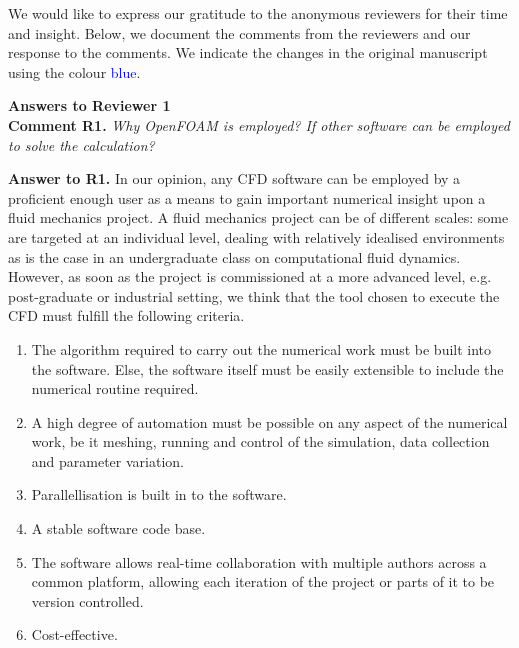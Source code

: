 \documentclass[12pt]{article}
\newcounter{question}
\newcommand{\name}{00}
\newcommand{\question}[1]{\refstepcounter{question} \noindent \textbf{Comment \name.\thequestion}\vskip 0.25cm \noindent \emph{#1}\\}
\newcommand{\answer}[1]{\noindent \textbf{Answer to \name.\thequestion}\vskip 0.25cm \noindent #1 \mbox{}\\}
\newcommand{\newperson}[2]{\renewcommand{\name}{#2} \setcounter{question}{0} \noindent \textbf{\large Answers to #1} \\}
\begin{document}
\noindent We would like to express our gratitude to the anonymous reviewers for their time and insight. Below, we document the comments from the reviewers and our response to the comments. We indicate the changes in the original manuscript using the colour \textcolor{blue}{blue}.

\vspace{1cm}

% 
% 
\newperson{Reviewer 1}{R1}

\question{Why OpenFOAM is employed? If other software can be employed to solve the calculation?} \label{quest:whyOF}

\answer{
    In our opinion, any CFD software can be employed by a proficient enough user as a means to gain important numerical insight upon a fluid mechanics project. A fluid mechanics project can be of different scales: some are targeted at an individual level, dealing with relatively idealised environments as is the case in an undergraduate class on computational fluid dynamics. However, as soon as the project is commissioned at a more advanced level, e.g. post-graduate or industrial setting, we think that the tool chosen to execute the CFD must fulfill the following criteria.

    \begin{enumerate}
        \item The algorithm required to carry out the numerical work must be built into the software. Else, the software itself must be easily extensible to include the numerical routine required. \label{enum:extensible}
        \item A high degree of automation must be possible on any aspect of the numerical work, be it meshing, running and control of the simulation, data collection and parameter variation. \label{enum:automation}
        \item Parallellisation is built in to the software. \label{enum:parallellisation}
        \item A stable software code base. \label{enum:stability}
        \item The software allows real-time collaboration with multiple authors across a common platform, allowing each iteration of the project or parts of it to be version controlled. \label{enum:collaboration}
        \item Cost-effective. \label{enum:cost}
    \end{enumerate}

}
\end{document}
